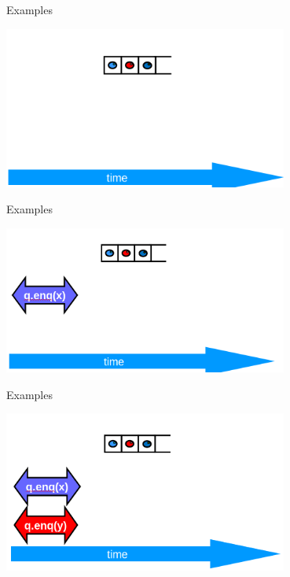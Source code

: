 \begin{frame}[fragile]{Examples}
\begin{center} \includegraphics[width=0.7\textwidth]{./pics/linear/58.png} \end{center}
\end{frame}

\begin{frame}{Examples}
\begin{center} \includegraphics[width=0.7\textwidth]{./pics/linear/59.png} \end{center}
\end{frame}

\begin{frame}{Examples}
\begin{center} \includegraphics[width=0.7\textwidth]{./pics/linear/60.png} \end{center}
\end{frame}

